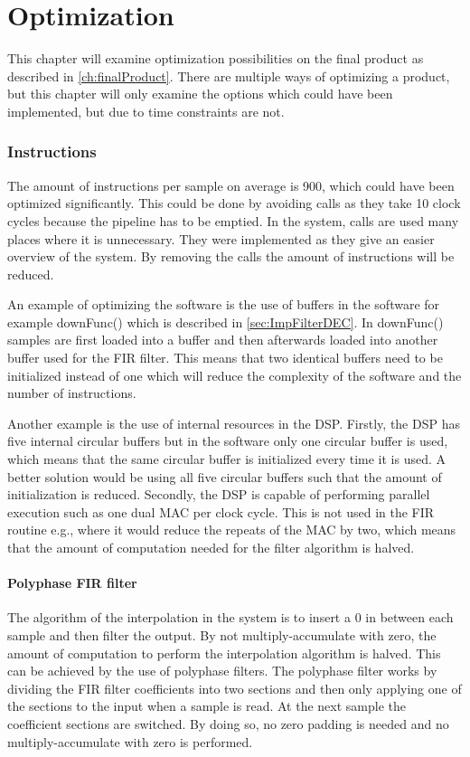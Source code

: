 \chapter{Optimization}
This chapter will examine optimization possibilities on the final product as described in \autoref{ch:finalProduct}. There are multiple ways of optimizing a product, but this chapter will only examine the options which could have been implemented, but due to time constraints are not. 

\subsection*{Instructions}
The amount of instructions per sample on average is 900, which could have been optimized significantly. This could be done by avoiding calls as they take 10 clock cycles because the pipeline has to be emptied. In the system, calls are used many places where it is unnecessary. They were implemented as they give an easier overview of the system. By removing the calls the amount of instructions will be reduced. 

An example of optimizing the software is the use of buffers in the software for example downFunc() which is described in \autoref{sec:ImpFilterDEC}. In downFunc() samples are first loaded into a buffer and then afterwards loaded into another buffer used for the FIR filter. This means that two identical buffers need to be initialized instead of one which will reduce the complexity of the software and the number of instructions. 

Another example is the use of internal resources in the DSP. Firstly, the DSP has five internal circular buffers but in the software only one circular buffer is used, which means that the same circular buffer is initialized every time it is used. A better solution would be using all five circular buffers such that the amount of initialization is reduced. Secondly, the DSP is capable of performing parallel execution such as one dual MAC per clock cycle. This is not used in the FIR routine e.g., where it would reduce the repeats of the MAC by two, which means that the amount of computation needed for the filter algorithm is halved.  

\subsubsection*{Polyphase FIR filter}
The algorithm of the interpolation in the system is to insert a 0 in between each sample and then filter the output. By not multiply-accumulate with zero, the amount of computation to perform the interpolation algorithm is halved. This can be achieved by the use of polyphase filters. The polyphase filter works by dividing the FIR filter coefficients into two sections and then only applying one of the sections to the input when a sample is read. At the next sample the coefficient sections are switched. By doing so, no zero padding is needed and no multiply-accumulate with zero is performed.

